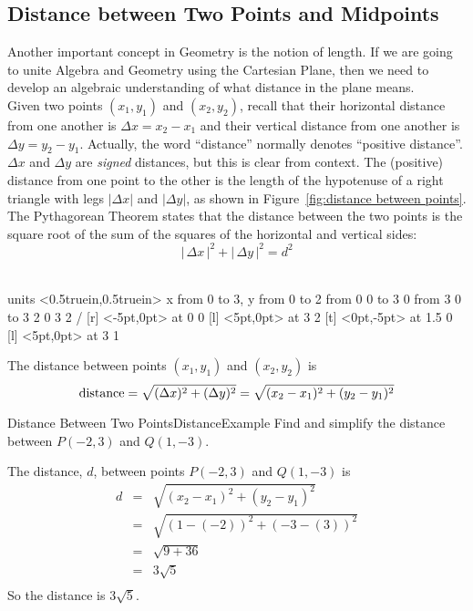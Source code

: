 \subsection{Distance between Two Points and Midpoints}\label{sec:DistanceAndMidpoints}

Another important concept in Geometry is the notion of length.  If we are going to unite Algebra and Geometry using the Cartesian Plane, then we need to develop an algebraic understanding of what distance in the plane means.\\

Given two points $(x_1,y_1)$ and $(x_2,y_2)$, recall that their
horizontal distance from one another is $\Delta x=x_2-x_1$ and their
vertical distance from one another is $\Delta y=y_2-y_1$. Actually,
the word ``distance'' normally denotes ``positive distance''. $\Delta
x$ and $\Delta y$ are {\it signed\/} distances, but this is clear from
context. The (positive) distance from one point to the other
is the length of the hypotenuse of a right triangle with legs $|\Delta
x|$ and $|\Delta y|$, as shown in Figure~\ref{fig:distance between
points}.  The Pythagorean Theorem states that the distance between
the two points is the square root of the sum of the squares of the
horizontal and vertical sides:\\
$$| \, \Delta x \,|^{2} + | \, \Delta y \, |^{2} =  d^{2}$$ \\



\figure[!ht]
\centerline{\vbox{\beginpicture
\normalgraphs
\setcoordinatesystem units <0.5truein,0.5truein>
\setplotarea x from 0 to 3, y from 0 to 2
\putrule from 0 0 to 3 0
\putrule from 3 0 to 3 2
 0 3 2 /
 [r] <-5pt,0pt> at 0 0
 [l] <5pt,0pt> at 3 2
 [t] <0pt,-5pt> at 1.5 0
 [l] <5pt,0pt> at 3 1
\endpicture}}
\caption{Distance between two points (here, $\Delta x$ and $\Delta y$ are positive). \label{fig:distance between points}}
\endfigure

\begin{formulabox}
The distance between points $(x_1,y_1)$ and $(x_2,y_2)$ is
$$\hbox{distance}=\sqrt{(\Delta x)^2+(\Delta y)^2}=\sqrt{(x_2-x_1)^2+ (y_2-y_1)^2}$$
\end{formulabox}

\bigskip

\begin{example}{Distance Between Two Points}{DistanceExample}
Find and simplify the distance between $P(-2,3)$ and $Q(1,-3)$.
\end{example}
\begin{solution}	
The distance, $d$, between points $P(-2,3)$ and $Q(1,-3)$ is \\
$$\begin{array}{rcl}
d & = & \sqrt{ (x_2-x_1)^2+ (y_2-y_1)^2}\\
 & = & \sqrt{(1-(-2))^2+(-3-(3))^2} \\
 & = & \sqrt{9+36} \\
 & = & 3\sqrt{5} \\
 \end{array}$$
 So the distance  is $3\sqrt{5}$.
\end{solution}

